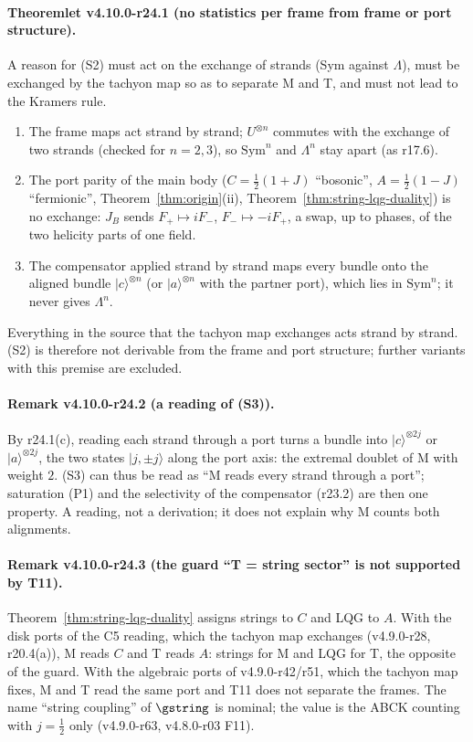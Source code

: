 \paragraph{Theoremlet v4.10.0-r24.1 (no statistics per frame from frame or port structure).}
A reason for (S2) must act on the exchange of strands (Sym against \(\Lambda\)), must be exchanged by the tachyon map so as to separate M
and T, and must not lead to the Kramers rule.
\begin{enumerate}[leftmargin=2em]
\item[(a)] The frame maps act strand by strand; \(U^{\otimes n}\) commutes with the exchange of two strands (checked for \(n=2,3\)), so
\(\mathrm{Sym}^n\) and \(\Lambda^n\) stay apart (as r17.6).
\item[(b)] The port parity of the main body (\(C=\tfrac12(1+J)\) ``bosonic'', \(A=\tfrac12(1-J)\) ``fermionic'', Theorem~\ref{thm:origin}(ii),
Theorem~\ref{thm:string-lqg-duality}) is no exchange: \(J_B\) sends \(F_+\mapsto iF_-\), \(F_-\mapsto-iF_+\), a swap, up to phases, of the two
helicity parts of one field.
\item[(c)] The compensator applied strand by strand maps every bundle onto the aligned bundle \(|c\rangle^{\otimes n}\) (or \(|a\rangle^{\otimes n}\) with
the partner port), which lies in \(\mathrm{Sym}^n\); it never gives \(\Lambda^n\).
\end{enumerate}
Everything in the source that the tachyon map exchanges acts strand by strand.  (S2) is therefore not derivable from the frame and port
structure; further variants with this premise are excluded.

\paragraph{Remark v4.10.0-r24.2 (a reading of (S3)).}
By r24.1(c), reading each strand through a port turns a bundle into \(|c\rangle^{\otimes2j}\) or \(|a\rangle^{\otimes2j}\), the two states \(|j,\pm j\rangle\) along the
port axis: the extremal doublet of M with weight \(2\).  (S3) can thus be read as ``M reads every strand through a port''; saturation
(P1) and the selectivity of the compensator (r23.2) are then one property.  A reading, not a derivation; it does not explain why M
counts both alignments.

\paragraph{Remark v4.10.0-r24.3 (the guard ``T = string sector'' is not supported by T11).}
Theorem~\ref{thm:string-lqg-duality} assigns strings to \(C\) and LQG to \(A\).  With the disk ports of the C5 reading, which the tachyon map
exchanges (v4.9.0-r28, r20.4(a)), M reads \(C\) and T reads \(A\): strings for M and LQG for T, the opposite of the guard.  With the
algebraic ports of v4.9.0-r42/r51, which the tachyon map fixes, M and T read the same port and T11 does not separate the frames.  The
name ``string coupling'' of \(\gstring\) is nominal; the value is the ABCK counting with \(j=\tfrac12\) only (v4.9.0-r63, v4.8.0-r03 F11).

